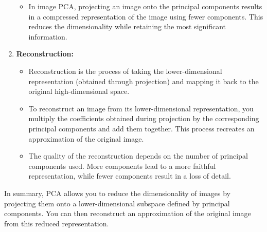 \documentclass{article}
\begin{document}
\begin{enumerate}
\begin{itemize}
    \item In image PCA, projecting an image onto the principal components results in a compressed representation of the image using fewer components. This reduces the dimensionality while retaining the most significant information.
\end{itemize}

\item \textbf{Reconstruction: }
\begin {itemize}
    \item Reconstruction is the process of taking the lower-dimensional representation (obtained through projection) and mapping it back to the original high-dimensional space.

    \item To reconstruct an image from its lower-dimensional representation, you multiply the coefficients obtained during projection by the corresponding principal components and add them together. This process recreates an approximation of the original image.

    \item The quality of the reconstruction depends on the number of principal components used. More components lead to a more faithful representation, while fewer components result in a loss of detail.
    
\end {itemize}

\end{enumerate}

In summary, PCA allows you to reduce the dimensionality of images by projecting them onto a lower-dimensional subspace defined by principal components. You can then reconstruct an approximation of the original image from this reduced representation.
\end{document}
